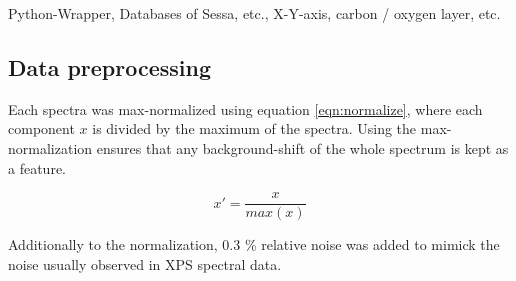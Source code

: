 Python-Wrapper, Databases of Sessa, etc., X-Y-axis, carbon / oxygen layer, etc.


\subsection{Data preprocessing}

Each spectra was max-normalized using equation \ref{eqn:normalize}, where each component $x$ is divided by the maximum of the spectra. Using the max-normalization ensures that any background-shift of the whole spectrum is kept as a feature.

\begin{equation}
    x' = \frac{x}{max(x)}
\label{eqn:normalize}
\end{equation}

Additionally to the normalization, 0.3 \% relative noise was added to mimick the noise usually observed in XPS spectral data.

